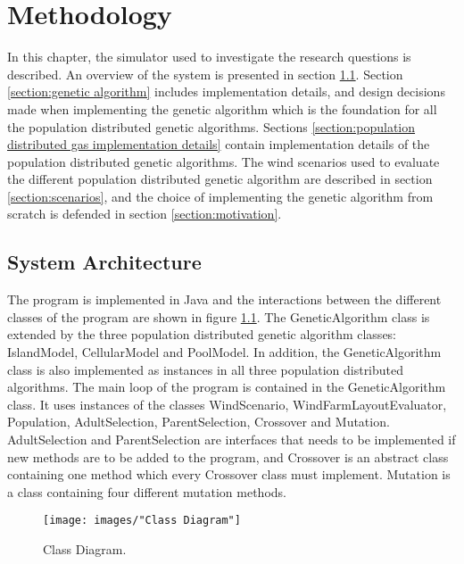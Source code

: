 \chapter{Methodology}\label{chapter:methodology}
In this chapter, the simulator used to investigate the research questions is described. An overview of the system is presented in section \ref{section:systemt architecture}. Section \ref{section:genetic algorithm} includes implementation details, and design decisions made when implementing the genetic algorithm which is the foundation for all the population distributed genetic algorithms. Sections \ref{section:population distributed gas implementation details} contain implementation details of the population distributed genetic algorithms. The wind scenarios used to evaluate the different population distributed genetic algorithm are described in section \ref{section:scenarios}, and the choice of implementing the genetic algorithm from scratch is defended in section \ref{section:motivation}.


\section{System Architecture}\label{section:systemt architecture}
The program is implemented in Java and the interactions between the different classes of the program are shown in figure \ref{figure:class diagram}. The GeneticAlgorithm class is extended by the three population distributed genetic algorithm classes: IslandModel, CellularModel and PoolModel. In addition, the GeneticAlgorithm class is also implemented as instances in all three population distributed algorithms. The main loop of the program is contained in the GeneticAlgorithm class. It uses instances of the classes WindScenario, WindFarmLayoutEvaluator, Population, AdultSelection, ParentSelection, Crossover and Mutation. AdultSelection and ParentSelection are interfaces that needs to be implemented if new methods are to be added to the program, and Crossover is an abstract class containing one method which every Crossover class must implement. Mutation is a class containing four different mutation methods. 


\begin{figure}[h!]
\begin{center}
\texttt{[image: images/"Class Diagram"]}
\caption{Class Diagram.}
\label{figure:class diagram}
\end{center}
\end{figure}


